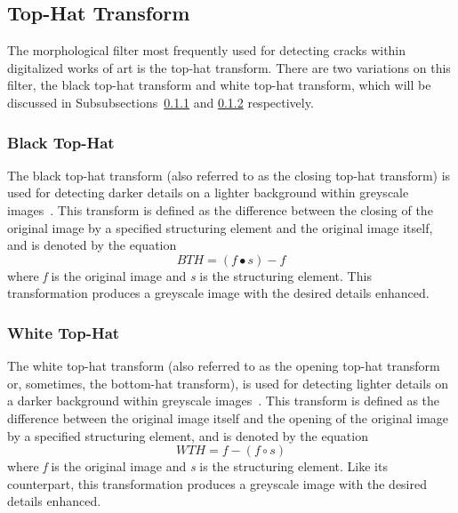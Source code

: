 \documentclass{sig-alternate}
\begin{document}
\subsection{Top-Hat Transform}
The morphological filter most frequently used for detecting cracks within digitalized works of art is the top-hat transform. There are two variations on this filter, the black top-hat transform and white top-hat transform, which will be discussed in Subsubsections~\ref{black top-hat} and \ref{white top-hat} respectively.

\subsubsection{Black Top-Hat}\label{black top-hat}
The black top-hat transform (also referred to as the closing top-hat transform) is used for detecting darker details on a lighter background within greyscale images~\cite{Altarpiece:2013, TopHat:2010}. This transform is defined as the difference between the closing of the original image by a specified structuring element and the original image itself, and is denoted by the equation
\begin{equation*}
BTH = (f \bullet s) - f
\end{equation*}
where \textit{f} is the original image and \textit{s} is the structuring element. This transformation produces a greyscale image with the desired details enhanced.

\subsubsection{White Top-Hat}\label{white top-hat}
The white top-hat transform (also referred to as the opening top-hat transform or, sometimes, the bottom-hat transform), is used for detecting lighter details on a darker background within greyscale images~\cite{Altarpiece:2013, TopHat:2010}. This transform is defined as the difference between the original image itself and the opening of the original image by a specified structuring element, and is denoted by the equation
\begin{equation*}
WTH = f - (f \circ s)
\end{equation*}
where \textit{f} is the original image and \textit{s} is the structuring element. Like its counterpart, this transformation produces a greyscale image with the desired details enhanced.
\end{document}
